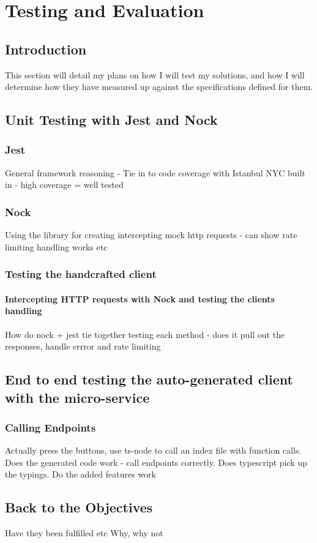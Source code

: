 \chapter{Testing and Evaluation}
\section{Introduction}
This section will detail my plans on how I will test my solutions, and how I will determine how they have measured up against the specifications defined for them.
\section{Unit Testing with Jest and Nock}
\subsection{Jest}
General framework reasoning - Tie in to code coverage with Istanbul NYC built in
- high coverage = well tested
\subsection{Nock}
Using the library for creating intercepting mock http requests - can show rate limiting handling works etc
\subsection{Testing the handcrafted client}
\subsubsection{Intercepting HTTP requests with Nock and testing the clients handling}
How do nock + jest tie together
testing each method - does it pull out the responses, handle errror and rate limiting
\section{End to end testing the auto-generated client with the micro-service}
\subsection{Calling Endpoints}
Actually press the buttons, use ts-node to call an index file with function calls. 
Does the generated code work - call endpoints correctly. Does typescript pick up the typings. Do the added features work
\section{Back to the Objectives}
Have they been fulfilled etc
Why, why not